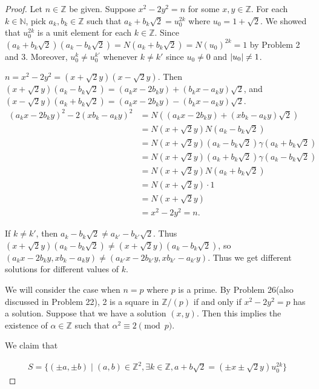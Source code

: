 \documentclass[12pt, psamsfonts]{amsart}
\theoremstyle{definition}
\theoremstyle{remark}
\numberwithin{equation}{section}
\begin{document}
\begin{proof}
  Let $n \in \mathbb{Z}$ be given.
  Suppose $x^2 - 2y^2 = n$ for some $x, y \in \mathbb{Z}$.
  For each $k \in \mathbb{N}$, pick $a_k, b_k \in \mathbb{Z}$ such that $a_k + b_k\sqrt{2} = u_0^{2k}$ where $u_0 = 1 + \sqrt{2}$.
  We showed that $u_0^{2k}$ is a unit element for each $k \in \mathbb{Z}$.
  Since $(a_k + b_k\sqrt{2})(a_k - b_k\sqrt{2}) = N(a_k + b_k\sqrt{2}) = N(u_0)^{2k} = 1$ by Problem 2 and 3.
  Moreover, $u_0^k \ne u_0^{k'}$ whenever $k \ne k'$ since $u_0 \ne 0$ and $\abs{u_0} \ne 1$.

  $n = x^2 - 2y^2 = (x + \sqrt{2}y)(x - \sqrt{2}y)$.
  Then $(x + \sqrt{2}y)(a_k - b_k\sqrt{2}) = (a_kx - 2b_ky) + (b_kx - a_ky)\sqrt{2}$, and $(x - \sqrt{2}y)(a_k + b_k\sqrt{2}) = (a_kx - 2b_ky) - (b_kx - a_ky)\sqrt{2}$.
  \begin{align*}
    (a_kx - 2b_ky)^2 - 2(xb_k - a_ky)^2
      &= N((a_kx - 2b_ky) + (xb_k - a_ky)\sqrt{2}) \\
      &= N(x + \sqrt{2}y)N(a_k - b_k\sqrt{2}) \\
      &= N(x + \sqrt{2}y)(a_k - b_k\sqrt{2})\gamma(a_k + b_k\sqrt{2}) \\
      &= N(x + \sqrt{2}y)(a_k + b_k\sqrt{2})\gamma(a_k - b_k\sqrt{2}) \\
      &= N(x + \sqrt{2}y)N(a_k + b_k\sqrt{2}) \\
      &= N(x + \sqrt{2}y) \cdot 1 \\
      &= N(x + \sqrt{2}y) \\
      &= x^2 - 2y^2 = n.
  \end{align*}

  If $k \ne k'$, then $a_k - b_k\sqrt{2} \ne a_{k'} - b_{k'}\sqrt{2}$.
  Thus $(x + \sqrt{2}y)(a_k - b_k\sqrt{2}) \ne (x + \sqrt{2}y)(a_k - b_k\sqrt{2})$, so $(a_kx - 2b_ky, xb_k - a_ky) \ne (a_{k'}x - 2b_{k'}y, xb_{k'} - a_{k'}y)$.
  Thus we get different solutions for different values of $k$.

  We will consider the case when $n = p$ where $p$ is a prime.
  By Problem 26(also discussed in Problem 22), 2 is a square in $\mathbb{Z} / (p)$ if and only if $x^2 - 2y^2 = p$ has a solution.
  Suppose that we have a solution $(x, y)$.
  Then this implies the existence of $\alpha \in \mathbb{Z}$ such that $\alpha^2 \equiv 2 \pmod p$.

  We claim that 

  \begin{align*}
    S = \{ (\pm a, \pm b) \mid (a, b) \in \mathbb{Z}^2, \exists k \in \mathbb{Z}, a + b\sqrt{2} = (\pm x \pm \sqrt{2}y)u_0^{2k} \}
  \end{align*}


\end{proof}
\end{document}
